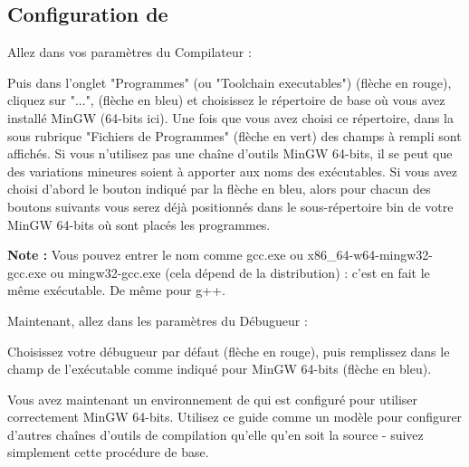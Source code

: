 \newpage
\subsection{Configuration de \codeblocks}

Allez dans vos paramètres du Compilateur :


Puis dans l'onglet "Programmes" (ou "Toolchain executables") (flèche en rouge), cliquez sur "...", (flèche en bleu) et choisissez le répertoire de base où vous avez installé MinGW (64-bits ici). Une fois que vous avez choisi ce répertoire, dans la sous rubrique "Fichiers de Programmes" (flèche en vert) des champs à rempli sont affichés. Si vous n'utilisez pas une chaîne d'outils MinGW 64-bits, il se peut que des variations mineures soient à apporter aux noms des exécutables. Si vous avez choisi d'abord le bouton indiqué par la flèche en bleu, alors pour chacun des boutons suivants vous serez déjà positionnés dans le sous-répertoire bin de votre MinGW 64-bits où sont placés les programmes.


\textbf{Note :} Vous pouvez entrer le nom comme gcc.exe ou x86\_64-w64-mingw32-gcc.exe ou mingw32-gcc.exe (cela dépend de la distribution) : c'est en fait le même exécutable. De même pour g++.


Maintenant, allez dans les paramètres du Débugueur :


Choisissez votre débugueur par défaut (flèche en rouge), puis remplissez dans le champ de l'exécutable comme indiqué pour MinGW 64-bits (flèche en bleu).



Vous avez maintenant un environnement de \codeblocks qui est configuré pour utiliser correctement MinGW 64-bits. Utilisez ce guide comme un modèle pour configurer d'autres chaînes d'outils de compilation qu'elle qu'en soit la source - suivez simplement cette procédure de base.

